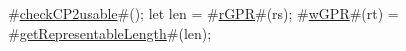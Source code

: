 #\hyperref[sailMIPSzcheckCP2usable]{checkCP2usable}#();
let len = #\hyperref[sailMIPSzrGPR]{rGPR}#(rs);
#\hyperref[sailMIPSzwGPR]{wGPR}#(rt) = #\hyperref[sailMIPSzgetRepresentableLength]{getRepresentableLength}#(len);
